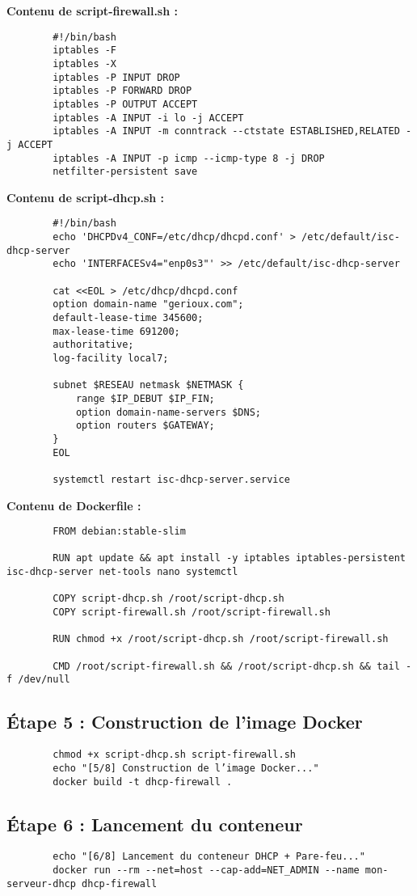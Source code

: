 	\textbf{Contenu de script-firewall.sh :}
	\begin{lstlisting}
		#!/bin/bash
		iptables -F
		iptables -X
		iptables -P INPUT DROP
		iptables -P FORWARD DROP
		iptables -P OUTPUT ACCEPT
		iptables -A INPUT -i lo -j ACCEPT
		iptables -A INPUT -m conntrack --ctstate ESTABLISHED,RELATED -j ACCEPT
		iptables -A INPUT -p icmp --icmp-type 8 -j DROP
		netfilter-persistent save
	\end{lstlisting}
	
	\textbf{Contenu de script-dhcp.sh :}
	\begin{lstlisting}
		#!/bin/bash
		echo 'DHCPDv4_CONF=/etc/dhcp/dhcpd.conf' > /etc/default/isc-dhcp-server
		echo 'INTERFACESv4="enp0s3"' >> /etc/default/isc-dhcp-server
		
		cat <<EOL > /etc/dhcp/dhcpd.conf
		option domain-name "gerioux.com";
		default-lease-time 345600;
		max-lease-time 691200;
		authoritative;
		log-facility local7;
		
		subnet $RESEAU netmask $NETMASK {
			range $IP_DEBUT $IP_FIN;
			option domain-name-servers $DNS;
			option routers $GATEWAY;
		}
		EOL
		
		systemctl restart isc-dhcp-server.service
	\end{lstlisting}
	
	\textbf{Contenu de Dockerfile :}
	\begin{lstlisting}
		FROM debian:stable-slim
		
		RUN apt update && apt install -y iptables iptables-persistent isc-dhcp-server net-tools nano systemctl
		
		COPY script-dhcp.sh /root/script-dhcp.sh
		COPY script-firewall.sh /root/script-firewall.sh
		
		RUN chmod +x /root/script-dhcp.sh /root/script-firewall.sh
		
		CMD /root/script-firewall.sh && /root/script-dhcp.sh && tail -f /dev/null
	\end{lstlisting}
	
	\subsection*{Étape 5 : Construction de l’image Docker}
	\begin{lstlisting}
		chmod +x script-dhcp.sh script-firewall.sh
		echo "[5/8] Construction de l’image Docker..."
		docker build -t dhcp-firewall .
	\end{lstlisting}
	
	\subsection*{Étape 6 : Lancement du conteneur}
	\begin{lstlisting}
		echo "[6/8] Lancement du conteneur DHCP + Pare-feu..."
		docker run --rm --net=host --cap-add=NET_ADMIN --name mon-serveur-dhcp dhcp-firewall
	\end{lstlisting}
	

